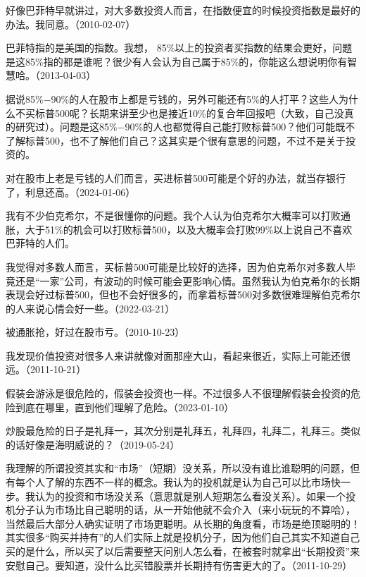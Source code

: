 
好像巴菲特早就讲过，对大多数投资人而言，在指数便宜的时候投资指数是最好的办法。我同意。（2010-02-07）

巴菲特指的是美国的指数。我想， 85\%以上的投资者买指数的结果会更好，问题是这85\%指的都是谁呢？很少有人会认为自己属于85\%的，你能这么想说明你有智慧哈。（2013-04-03）

据说85\%\( - \)90\%的人在股市上都是亏钱的，另外可能还有5\%的人打平？这些人为什么不买标普500呢？长期来讲至少也是接近10\%的复合年回报吧（大致，自己没真的研究过）。问题是这85\%\( - \)90\%的人也都觉得自己能打败标普500？他们可能既不了解标普500，也不了解他们自己？这其实是个很有意思的问题，不过不是关于投资的。

对在股市上老是亏钱的人们而言，买进标普500可能是个好的办法，就当存银行了，利息还高。（2024-01-06）


我有不少伯克希尔，不是很懂你的问题。我个人认为伯克希尔大概率可以打败通胀，大于51\%的机会可以打败标普500，以及大概率会打败99\%以上说自己不喜欢巴菲特的人们。

我觉得对多数人而言，买标普500可能是比较好的选择，因为伯克希尔对多数人毕竟还是“一家”公司，有波动的时候可能会更影响心情。虽然我认为伯克希尔的长期表现会好过标普500，但也不会好很多的，而拿着标普500对多数很难理解伯克希尔的人来说心情会好一些。（2022-03-21）

被通胀抢，好过在股市亏。（2010-10-23）

我发现价值投资对很多人来讲就像对面那座大山，看起来很近，实际上可能还很远。（2011-10-21）

假装会游泳是很危险的，假装会投资也一样。不过很多人不很理解假装会投资的危险到底在哪里，直到他们理解了危险。（2023-01-10）

炒股最危险的日子是礼拜一，其次分别是礼拜五，礼拜四，礼拜二，礼拜三。类似的话好像是海明威说的？（2019-05-24）

我理解的所谓投资其实和“市场”（短期）没关系，所以没有谁比谁聪明的问题，但有每个人了解的东西不一样的概念。我认为的投机就是认为自己可以比市场快一步。我认为的投资和市场没关系（意思就是别人短期怎么看没关系）。如果一个投机分子认为市场比自己聪明的话，从一开始他就不会介入（来小玩玩的不算哈），当然最后大部分人确实证明了市场更聪明。从长期的角度看，市场是绝顶聪明的！其实很多“购买并持有”的人们实际上就是投机分子，因为他们自己其实不知道自己买的是什么，所以买了以后需要整天问别人怎么看，在被套时就拿出“长期投资”来安慰自己。要知道，没什么比买错股票并长期持有伤害更大的了。（2011-10-29）

